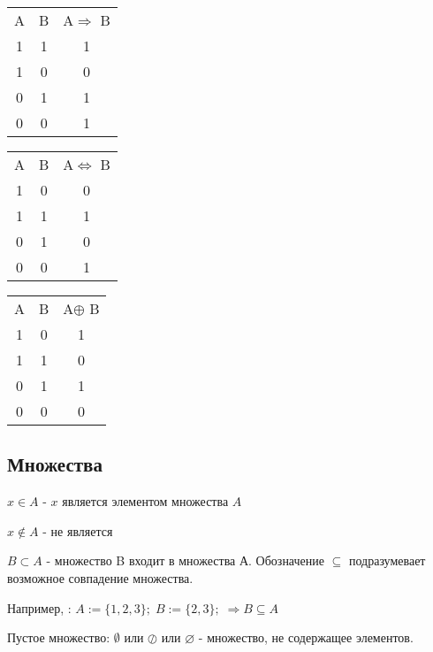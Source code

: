 \begin{table}[h]
    \begin{subtable}[t]{0.2\textwidth}
        \begin{tabular}[h]{c c c}
            A & B & A$\Longrightarrow$ B \\
            1 & 1 & 1 \\
            1 & 0 & 0 \\
            0 & 1 & 1 \\
            0 & 0 & 1
        \end{tabular}
    \end{subtable}
    \begin{subtable}[t]{0.2\textwidth}
    \begin{tabular}[h]{c c c}
        A & B & A$\Leftrightarrow$ B \\
        1 & 0 & 0 \\
        1 & 1 & 1 \\
        0 & 1 & 0 \\
        0 & 0 & 1
    \end{tabular}
    \end{subtable}
    \begin{subtable}[t]{0.2\textwidth}
    \begin{tabular}[h]{c c c}
        A & B & A$\oplus$ B \\
        1 & 0 & 1 \\
        1 & 1 & 0 \\
        0 & 1 & 1 \\
        0 & 0 & 0
    \end{tabular}
    \end{subtable}
\end{table}

\subsection{Множества}

$x\in A$ - $x$ является элементом множества $A$

$x\notin A$ - не является

$B\subset A$ - множество B входит в множества А. Обозначение $\subseteq$ подразумевает возможное совпадение множества.

Например, : $A := \{1,2,3\};\; B:=\{2,3\};\;\Rightarrow B\subseteq A$

Пустое множество: $\emptyset$ или $\oslash$ или $\varnothing$ - множество, не содержащее элементов.

